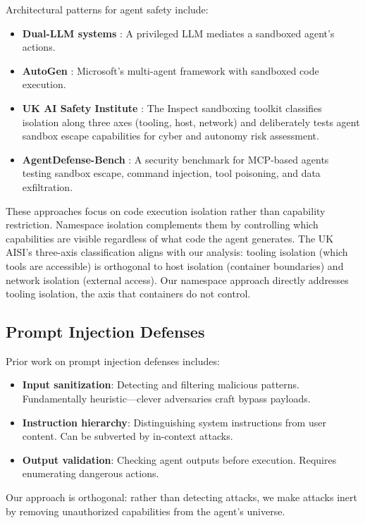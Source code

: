 \documentclass[acmsmall,screen,review]{acmart}
\begin{document}
Architectural patterns for agent safety include:
\begin{itemize}
    \item \textbf{Dual-LLM systems} \cite{masood2024sandboxed}: A privileged LLM mediates a sandboxed agent's actions.
    \item \textbf{AutoGen} \cite{autogen2023}: Microsoft's multi-agent framework with sandboxed code execution.
    \item \textbf{UK AI Safety Institute} \cite{aisi2025sandboxing}: The Inspect sandboxing toolkit classifies isolation along three axes (tooling, host, network) and deliberately tests agent sandbox escape capabilities for cyber and autonomy risk assessment.
    \item \textbf{AgentDefense-Bench} \cite{agentdefensebench2025}: A security benchmark for MCP-based agents testing sandbox escape, command injection, tool poisoning, and data exfiltration.
\end{itemize}

These approaches focus on code execution isolation rather than capability restriction. Namespace isolation complements them by controlling which capabilities are visible regardless of what code the agent generates. The UK AISI's three-axis classification aligns with our analysis: tooling isolation (which tools are accessible) is orthogonal to host isolation (container boundaries) and network isolation (external access). Our namespace approach directly addresses tooling isolation, the axis that containers do not control.

\subsection{Prompt Injection Defenses}

Prior work on prompt injection defenses includes:
\begin{itemize}
    \item \textbf{Input sanitization}: Detecting and filtering malicious patterns. Fundamentally heuristic---clever adversaries craft bypass payloads.
    \item \textbf{Instruction hierarchy}: Distinguishing system instructions from user content. Can be subverted by in-context attacks.
    \item \textbf{Output validation}: Checking agent outputs before execution. Requires enumerating dangerous actions.
\end{itemize}

Our approach is orthogonal: rather than detecting attacks, we make attacks inert by removing unauthorized capabilities from the agent's universe.
\end{document}
